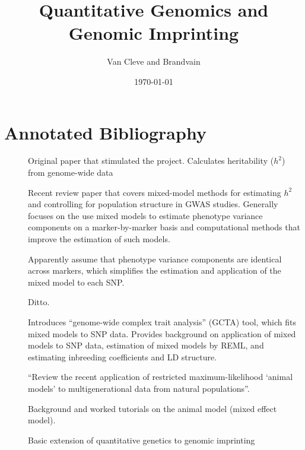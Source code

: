 \documentclass[11pt]{article}
\begin{document}
\title{Quantitative Genomics and Genomic Imprinting}
\author{Van Cleve and Brandvain}
\date{\today}
\maketitle

\section{Annotated Bibliography}

\begin{description}
\item[\citep{Visscher2006}] Original paper that stimulated the project.  Calculates heritability ($h^2$) from genome-wide data
\item[\citep{Yang2014}] Recent review paper that covers mixed-model methods for estimating $h^2$ and controlling for population structure in GWAS studies.  Generally focuses on the use mixed models to estimate phenotype variance components on a marker-by-marker basis and computational methods that improve the estimation of such models.
\item[\citep{Kang2010}] Apparently assume that phenotype variance components are identical across markers, which simplifies the estimation and application of the mixed model to each SNP.
\item[\citep{Zhang2010a}] Ditto.
\item[\citep{Yang2011}] Introduces ``genome-wide complex trait analysis'' (GCTA) tool, which fits mixed models to SNP data.  Provides background on application of mixed models to SNP data, estimation of mixed models by REML, and estimating inbreeding coefficients and LD structure.
\item[\citep{Kruuk2004}] ``Review the recent application of restricted maximum-likelihood ‘animal models’ to multigenerational data from natural populations''.
\item[\citep{Wilson2010}] Background and worked tutorials on the animal model (mixed effect model).
\item[\citep{Spencer2002}] Basic extension of quantitative genetics to genomic imprinting
\end{description}



\end{document}
